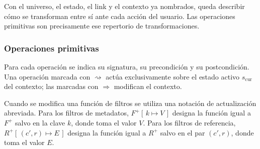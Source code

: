 Con el universo, el estado, el link y el contexto ya nombrados, queda describir cómo se transforman entre
sí ante cada acción del usuario. Las operaciones primitivas son precisamente ese repertorio de
transformaciones.

\subsubsection*{Operaciones primitivas}

Para cada operación se indica su signatura, su precondición y su postcondición. Una operación marcada con
$\rightsquigarrow$ actúa exclusivamente sobre el estado activo $s_{\text{cur}}$ del contexto; las marcadas
con $\Rightarrow$ modifican el contexto.

Cuando se modifica una función de filtros se utiliza una notación de actualización abreviada. Para los
filtros de metadatos, $F^{+}[\,k \mapsto V\,]$ designa la función igual a $F^{+}$ salvo en la clave $k$, donde
toma el valor $V$. Para los filtros de referencia, $R^{+}[\,(c', r) \mapsto E\,]$ designa la función igual a
$R^{+}$ salvo en el par $(c', r)$, donde toma el valor $E$.

